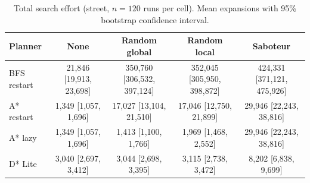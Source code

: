 \begin{table}[!t]
\centering
\footnotesize
\caption{Total search effort (street, $n=120$ runs per cell). Mean expansions with 95\% bootstrap confidence interval.}
\label{tab:total-street}
\begin{tabular}{lcccc}
\toprule
Planner & None & Random global & Random local & Saboteur \\
\midrule
BFS restart & 21,846 [19,913, 23,698] & 350,760 [306,532, 397,124] & 352,045 [305,950, 398,872] & 424,331 [371,121, 475,926] \\
A* restart & 1,349 [1,057, 1,696] & 17,027 [13,104, 21,510] & 17,046 [12,750, 21,899] & 29,946 [22,243, 38,816] \\
A* lazy & 1,349 [1,057, 1,696] & 1,413 [1,100, 1,766] & 1,969 [1,468, 2,552] & 29,946 [22,243, 38,816] \\
D* Lite & 3,040 [2,697, 3,412] & 3,044 [2,698, 3,395] & 3,115 [2,738, 3,472] & 8,202 [6,838, 9,699] \\
\bottomrule
\end{tabular}
\end{table}
